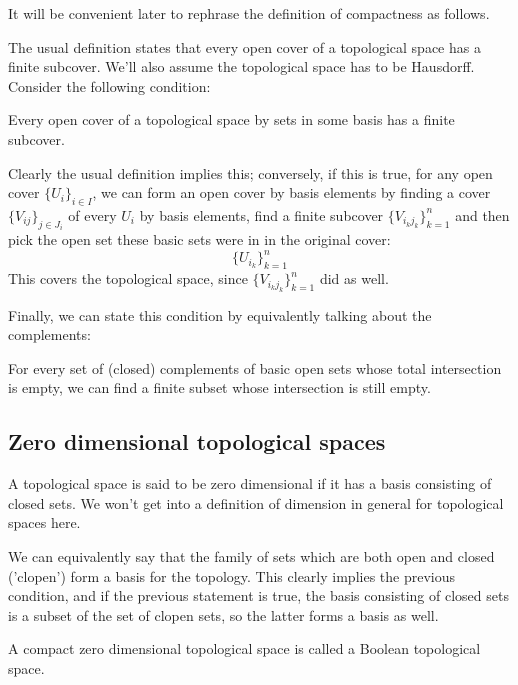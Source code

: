 \documentclass{article}
\begin{document}
        It will be convenient later to rephrase the definition of compactness as
        follows.

        The usual definition states that every open cover of a topological space
        has a finite subcover. We'll also assume the topological space has to be
        Hausdorff. Consider the following condition:

        Every open cover of a topological space by sets in some basis has a
        finite subcover.

        Clearly the usual definition implies this; conversely, if this is true,
        for any open cover $\{U_i\}_{i \in I}$, we can form an open cover by
        basis elements by finding a cover $\{V_{ij}\}_{j \in J_i}$ of every
        $U_i$ by basis elements, find a finite subcover
        $\{V_{i_kj_k}\}_{k=1}^n$ and then pick the open set these basic sets
        were in in the original cover:
        \[\{U_{i_k}\}_{k=1}^n\]
        This covers the topological space, since $\{V_{i_kj_k}\}_{k=1}^n$ did as
        well.

        Finally, we can state this condition by equivalently talking about the
        complements:

        For every set of (closed) complements of basic open sets whose total
        intersection is empty, we can find a finite subset whose intersection is
        still empty.


      \subsection{Zero dimensional topological spaces}

        A topological space is said to be zero dimensional if it has a basis
        consisting of closed sets. We won't get into a definition of dimension
        in general for topological spaces here.

        We can equivalently say that the family of sets which are both open and
        closed ('clopen') form a basis for the topology. This clearly implies
        the previous condition, and if the previous statement is true, the basis
        consisting of closed sets is a subset of the set of clopen sets, so the
        latter forms a basis as well.

        A compact zero dimensional topological space is called a Boolean
        topological space.
\end{document}

